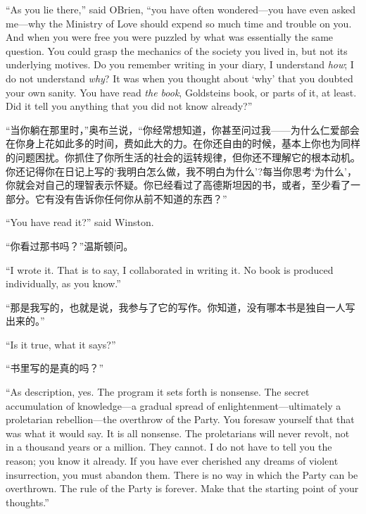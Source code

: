 \begin{paracol}{2}
\switchcolumn*

``As you lie there,'' said O\textquotesingle Brien, ``you have often
wondered---you have even asked me---why the Ministry of Love should
expend so much time and trouble on you. And when you were free you were
puzzled by what was essentially the same question. You could grasp the
mechanics of the society you lived in, but not its underlying motives.
Do you remember writing in your diary, \textquotesingle I understand
\emph{how}; I do not understand \emph{why}\textquotesingle? It was when
you thought about `why' that you
doubted your own sanity. You have read \emph{the book},
Goldstein\textquotesingle s book, or parts of it, at least. Did it tell
you anything that you did not know already?''

\switchcolumn

``当你躺在那里时，''奥布兰说，``你经常想知道，你甚至问过我——为什么仁爱部会在你身上花如此多的时间，费如此大的力。在你还自由的时候，基本上你也为同样的问题困扰。你抓住了你所生活的社会的运转规律，但你还不理解它的根本动机。你还记得你在日记上写的`我明白怎么做，我不明白为什么'?每当你思考`为什么'，你就会对自己的理智表示怀疑。你已经看过了高德斯坦因的书，或者，至少看了一部分。它有没有告诉你任何你从前不知道的东西？''

\switchcolumn*

``You have read it?'' said Winston.

\switchcolumn

``你看过那书吗？''温斯顿问。

\switchcolumn*

``I wrote it. That is to say, I collaborated in writing it. No book is
produced individually, as you know.''

\switchcolumn

``那是我写的，也就是说，我参与了它的写作。你知道，没有哪本书是独自一人写出来的。''

\switchcolumn*

``Is it true, what it says?''

\switchcolumn

``书里写的是真的吗？''

\switchcolumn*

``As description, yes. The program it sets forth is nonsense. The secret
accumulation of knowledge---a gradual spread of
enlightenment---ultimately a proletarian rebellion---the overthrow of
the Party. You foresaw yourself that that was what it would say. It is
all nonsense. The proletarians will never revolt, not in a thousand
years or a million. They cannot. I do not have to tell you the reason;
you know it already. If you have ever cherished any dreams of violent
insurrection, you must abandon them. There is no way in which the Party
can be overthrown. The rule of the Party is forever. Make that the
starting point of your thoughts.''


\end{paracol}
